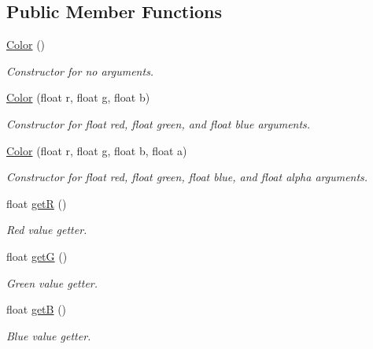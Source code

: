 \subsection*{Public Member Functions}
\begin{DoxyCompactItemize}
\item 
\mbox{\label{classColor_a9a742cbe9f9f4037f5d9f4e81a9b2428}} 
\hyperlink{classColor_a9a742cbe9f9f4037f5d9f4e81a9b2428}{Color} ()
\begin{DoxyCompactList}\small\item\em Constructor for no arguments. \end{DoxyCompactList}\item 
\mbox{\label{classColor_a373c542c99fb83ce9c7c08aae76b2718}} 
\hyperlink{classColor_a373c542c99fb83ce9c7c08aae76b2718}{Color} (float r, float g, float b)
\begin{DoxyCompactList}\small\item\em Constructor for float red, float green, and float blue arguments. \end{DoxyCompactList}\item 
\mbox{\label{classColor_a6e4627389673c8b5cce81bf3eec79938}} 
\hyperlink{classColor_a6e4627389673c8b5cce81bf3eec79938}{Color} (float r, float g, float b, float a)
\begin{DoxyCompactList}\small\item\em Constructor for float red, float green, float blue, and float alpha arguments. \end{DoxyCompactList}\item 
float \hyperlink{classColor_a65df51367c71b8d2147e1db240e62429}{getR} ()
\begin{DoxyCompactList}\small\item\em Red value getter. \end{DoxyCompactList}\item 
float \hyperlink{classColor_a5c32d43f4405ace1cdb1cd0e32593e1a}{getG} ()
\begin{DoxyCompactList}\small\item\em Green value getter. \end{DoxyCompactList}\item 
float \hyperlink{classColor_a099852b0829e9551169a90768146e61e}{getB} ()
\begin{DoxyCompactList}\small\item\em Blue value getter. \end{DoxyCompactList}\item 

\end{DoxyCompactItemize}
